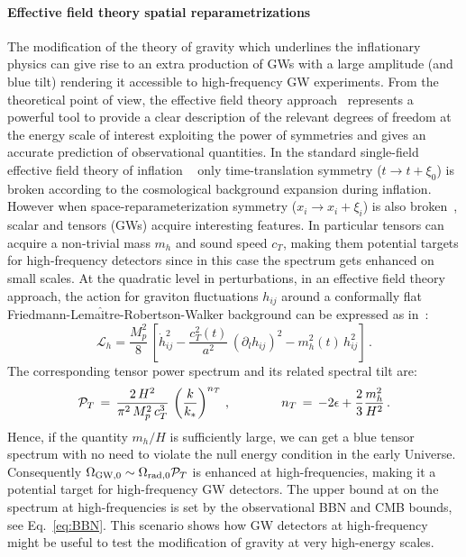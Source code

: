 \documentclass[11pt,a4paper]{article}
\begin{document}
\paragraph{Effective field theory spatial reparametrizations}
The modification of  the theory of gravity which underlines the inflationary physics can give rise to an extra production of GWs with a large amplitude (and blue tilt) rendering it accessible to high-frequency GW experiments. From the theoretical point of view, the effective field theory approach~\cite{Cheung:2007st} represents a powerful tool to provide a clear description of the relevant degrees of freedom at the energy scale of interest exploiting the power of symmetries and gives an accurate prediction of observational quantities.
In the standard single-field effective field theory of inflation ~\cite{Cheung:2007st} only time-translation symmetry ($t\rightarrow t+\xi_{0}$) is broken according to the cosmological background expansion during inflation. However when space-reparameterization symmetry  ($x_{i}\rightarrow x_{i}+\xi_{i}$) is also broken~\cite{Bartolo:2015qvr,Graef:2015ova}, scalar and tensors (GWs) acquire interesting features. In particular tensors can acquire a non-trivial mass $m_h$ and sound speed $c_T$, making them potential targets for high-frequency detectors since in this case the spectrum gets enhanced on small scales. At the quadratic level in perturbations, in an effective field theory approach, the action for graviton fluctuations $h_{ij}$ around a conformally flat
Friedmann-Lema$\hat{\text{i}}$tre-Robertson-Walker background can be expressed
as in~\cite{Cannone:2014uqa, Bartolo:2015qvr,Ricciardone:2016lym}:
%
\begin{equation} \label{sol-qac}
\mathcal{L}_{h}=\frac{M_p^2}{8}\,\left[\dot h_{ij}^2 -\frac{c_T^2(t)}{a^2} \,\left( \partial_l h_{ij}\right)^2
-m_h^2(t)\,h_{ij}^2\right]\,.
\end{equation}
%
The corresponding tensor power spectrum and its related spectral tilt are:
\begin{equation}
{\cal P}_T\,=\,\frac{2\,H^2}{\pi^2\,M_p^2\,c_T^3}\,\left( \frac{k}{k_*}\right)^{n_T}\,,\quad \quad\quad \quad n_T\,=\,-2 \epsilon+\frac{2}{3}
\frac{m_{h}^2}{H^2}\,.
\label{nteft}
\end{equation}
Hence, if the quantity $m_{h}/H$ is sufficiently large,  we can get a blue tensor spectrum with no need to violate the null energy condition in the early Universe. Consequently $\Omega_{\text{GW},0} \sim \Omega_{\text{rad},0} {\cal P}_T$ is enhanced at high-frequencies, making it a potential target for high-frequency GW detectors. The upper bound at on the spectrum at high-frequencies is set by the observational BBN and CMB bounds, see Eq.~\eqref{eq:BBN}. This scenario shows how GW detectors at high-frequency might be useful to test the modification of gravity at very high-energy scales.
\end{document}
